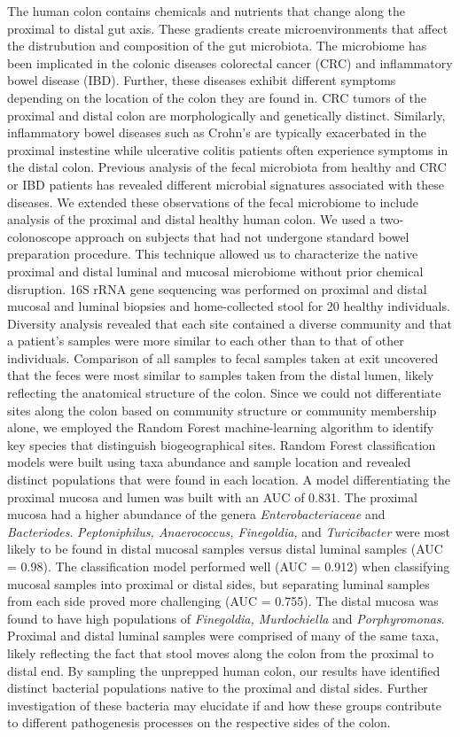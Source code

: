 \documentclass[11pt,]{article}
\begin{document}
The human colon contains chemicals and nutrients that change along the
proximal to distal gut axis. These gradients create microenvironments
that affect the distrubution and composition of the gut microbiota. The
microbiome has been implicated in the colonic diseases colorectal cancer
(CRC) and inflammatory bowel disease (IBD). Further, these diseases
exhibit different symptoms depending on the location of the colon they
are found in. CRC tumors of the proximal and distal colon are
morphologically and genetically distinct. Similarly, inflammatory bowel
diseases such as Crohn's are typically exacerbated in the proximal
instestine while ulcerative colitis patients often experience symptoms
in the distal colon. Previous analysis of the fecal microbiota from
healthy and CRC or IBD patients has revealed different microbial
signatures associated with these diseases. We extended these
observations of the fecal microbiome to include analysis of the proximal
and distal healthy human colon. We used a two-colonoscope approach on
subjects that had not undergone standard bowel preparation procedure.
This technique allowed us to characterize the native proximal and distal
luminal and mucosal microbiome without prior chemical disruption. 16S
rRNA gene sequencing was performed on proximal and distal mucosal and
luminal biopsies and home-collected stool for 20 healthy individuals.
Diversity analysis revealed that each site contained a diverse community
and that a patient's samples were more similar to each other than to
that of other individuals. Comparison of all samples to fecal samples
taken at exit uncovered that the feces were most similar to samples
taken from the distal lumen, likely reflecting the anatomical structure
of the colon. Since we could not differentiate sites along the colon
based on community structure or community membership alone, we employed
the Random Forest machine-learning algorithm to identify key species
that distinguish biogeographical sites. Random Forest classification
models were built using taxa abundance and sample location and revealed
distinct populations that were found in each location. A model
differentiating the proximal mucosa and lumen was built with an AUC of
0.831. The proximal mucosa had a higher abundance of the genera
\emph{Enterobacteriaceae} and \emph{Bacteriodes}. \emph{Peptoniphilus,
Anaerococcus, Finegoldia,} and \emph{Turicibacter} were most likely to
be found in distal mucosal samples versus distal luminal samples (AUC =
0.98). The classification model performed well (AUC = 0.912) when
classifying mucosal samples into proximal or distal sides, but
separating luminal samples from each side proved more challenging (AUC =
0.755). The distal mucosa was found to have high populations of
\emph{Finegoldia, Murdochiella} and \emph{Porphyromonas}. Proximal and
distal luminal samples were comprised of many of the same taxa, likely
reflecting the fact that stool moves along the colon from the proximal
to distal end. By sampling the unprepped human colon, our results have
identified distinct bacterial populations native to the proximal and
distal sides. Further investigation of these bacteria may elucidate if
and how these groups contribute to different pathogenesis processes on
the respective sides of the colon.
\end{document}

